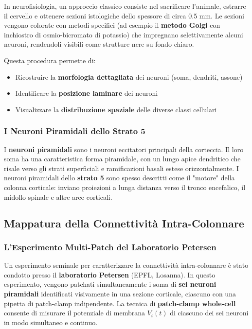 In neurofisiologia, un approccio classico consiste nel sacrificare l'animale, estrarre il cervello e ottenere sezioni istologiche dello spessore di circa 0.5 mm. Le sezioni vengono colorate con metodi specifici (ad esempio il \textbf{metodo Golgi} con inchiostro di osmio-bicromato di potassio) che impregnano selettivamente alcuni neuroni, rendendoli visibili come strutture nere su fondo chiaro.

Questa procedura permette di:
\begin{itemize}
    \item Ricostruire la \textbf{morfologia dettagliata} dei neuroni (soma, dendriti, assone)
    \item Identificare la \textbf{posizione laminare} dei neuroni
    \item Visualizzare la \textbf{distribuzione spaziale} delle diverse classi cellulari
\end{itemize}

\subsubsection{I Neuroni Piramidali dello Strato 5}

I \textbf{neuroni piramidali} sono i neuroni eccitatori principali della corteccia. Il loro soma ha una caratteristica forma piramidale, con un lungo apice dendritico che risale verso gli strati superficiali e ramificazioni basali estese orizzontalmente. I neuroni piramidali dello \textbf{strato 5} sono spesso descritti come il "motore" della colonna corticale: inviano proiezioni a lunga distanza verso il tronco encefalico, il midollo spinale e altre aree corticali.


\subsection{Mappatura della Connettività Intra-Colonnare}

\subsubsection{L'Esperimento Multi-Patch del Laboratorio Petersen}

Un esperimento seminale per caratterizzare la connettività intra-colonnare è stato condotto presso il \textbf{laboratorio Petersen} (EPFL, Losanna). In questo esperimento, vengono patchati simultaneamente i soma di \textbf{sei neuroni piramidali} identificati visivamente in una sezione corticale, ciascuno con una pipetta di patch-clamp indipendente. La tecnica di \textbf{patch-clamp whole-cell} consente di misurare il potenziale di membrana $V_i(t)$ di ciascuno dei sei neuroni in modo simultaneo e continuo.

